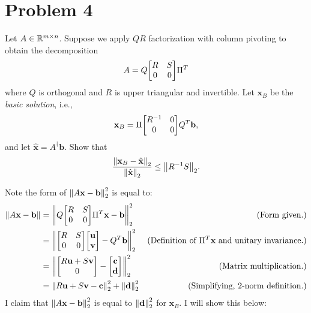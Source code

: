 \section{Problem 4}
Let $A \in \mathbb{R}^{m \times n}$. Suppose we apply $QR$ factorization with column pivoting to obtain the decomposition
\[
A = Q\mqty[R&S\\0&0]\Pi^T
\]
where $Q$ is orthogonal and $R$ is upper triangular and invertible. Let $\textbf{x}_B$ be the \textit{basic solution}, i.e.,
\[
\textbf{x}_B = \Pi \mqty[R^\inv &0\\0&0]Q^T\textbf{b},
\]
and let $\hat{\textbf{x}} = A^\dag \textbf{b}.$ Show that 
\[
\frac{\norm{\textbf{x}_B - \hat{\textbf{x}}}_2}{\norm{\hat{\textbf{x}}}_2} \leq \norm{R^{-1} S}_2.
\]
\partbreak
\begin{solution}

    Note the form of $\norm{A\textbf{x} - \textbf{b}}_2^2$ is equal to:
\alignbreak
\begin{align*}
    \norm{A\textbf{x} - \textbf{b}} &= \norm{Q\mqty[R &S\\0&0]\Pi^T\textbf{x} - \textbf{b}}_2^2 &\text{(Form given.)}\\
    &= \norm{\mqty[R &S\\0&0]\mqty[\textbf{u} \\\textbf{v}] - Q^T\textbf{b}}_2 ^2&\text{(Definition of $\Pi^T\textbf{x}$ and unitary invariance.)}\\
    &= \norm{\mqty[R\textbf{u} + S\textbf{v}\\0] - \mqty[\textbf{c}\\\textbf{d}]}_2^2 &\text{(Matrix multiplication.)}\\
    &= \norm{R\textbf{u}+ S\textbf{v} - \textbf{c}}_2^2 + \norm{\textbf{d}}_2^2 &\text{(Simplifying, 2-norm definition.)}\\
\end{align*}
I claim that $\norm{A\textbf{x} - \textbf{b}}_2^2$ is equal to $\norm{\textbf{d}}_2^2$ for $\textbf{x}_B$. I will show this below:


\end{solution}
